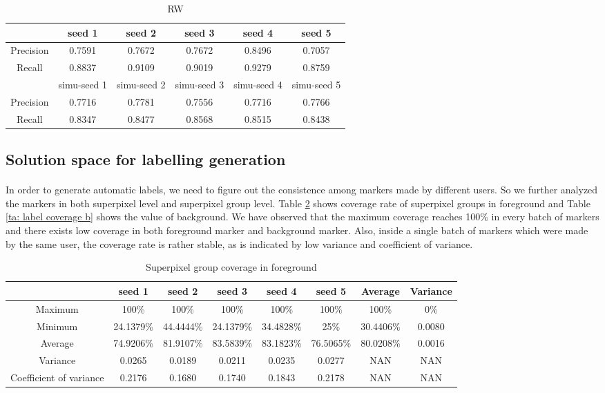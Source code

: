 \documentclass[runningheads,a4paper]{llncs}
\begin{document}
\begin{table}
\centering
\begin{tabular}{|c|c|c|c|c|c|}
\hline
 & seed 1 & seed 2&seed 3&seed 4&seed 5 \\
\hline
Precision& 0.7591 & 0.7672 & 0.7672& 0.8496& 0.7057 \\
\hline
Recall& 0.8837 & 0.9109 & 0.9019& 0.9279& 0.8759 \\
\hline
 & simu-seed 1 & simu-seed 2&simu-seed 3&simu-seed 4&simu-seed 5 \\
\hline
Precision& 0.7716 & 0.7781 & 0.7556& 0.7716& 0.7766 \\
\hline
Recall& 0.8347 & 0.8477 & 0.8568& 0.8515& 0.8438 \\
\hline
\end{tabular}
\caption{RW}
\label{ta: simu in rw}
\end{table} 


\subsection{Solution space for labelling generation}
\paragraph{} In order to generate automatic labels, we need to figure out the consistence among markers made by different users. So we further analyzed the markers in both superpixel level and superpixel group level. Table \ref{ta: label coverage f} shows coverage rate of superpixel groups in foreground and Table \ref{ta: label coverage b} shows the value of background.
We have observed that the maximum coverage reaches 100\% in every batch of markers and there exists low coverage in both foreground marker and background marker. Also, inside a single batch of markers which were made by the same user, the coverage rate is rather stable, as is indicated by low variance and coefficient of variance. 


\begin{table}
\centering
\begin{tabular}{|c|c|c|c|c|c|c|c|}
\hline
 & seed 1 & seed 2&seed 3&seed 4&seed 5&Average&Variance\\
\hline
Maximum& 100\% & 100\% & 100\%& 100\%& 100\%&100\%&0\%\\
\hline
Minimum& 24.1379\% & 44.4444\% & 24.1379\%& 34.4828\%& 25\%&30.4406\%&0.0080 \\
\hline
Average& 74.9206\% & 81.9107\% & 83.5839\%& 83.1823\%& 76.5065\%&80.0208\%&0.0016 \\
\hline
Variance& 0.0265 & 0.0189 & 0.0211& 0.0235& 0.0277&NAN&NAN \\
\hline
Coefficient of variance& 0.2176 & 0.1680 & 0.1740& 0.1843& 0.2178&NAN&NAN \\
\hline
\end{tabular}
\caption{Superpixel group coverage in foreground}
\label{ta: label coverage f}
\end{table} 
\end{document}
